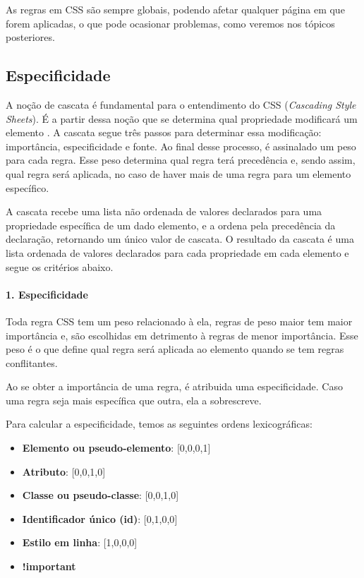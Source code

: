 As regras em CSS são sempre globais,
podendo afetar qualquer página em que forem aplicadas, o que pode ocasionar
problemas, como veremos nos tópicos posteriores.

\hypertarget{especificidade}{%
\subsection{Especificidade}\label{especificidade}}

A noção de cascata é fundamental para o entendimento do CSS (\emph{Cascading
Style Sheets}). É a partir dessa noção que se determina qual propriedade
modificará um elemento \cite{friedman}. A cascata segue três passos para determinar essa
modificação: importância, especificidade e fonte. Ao final desse
processo, é assinalado um peso para cada regra. Esse peso determina qual
regra terá precedência e, sendo assim, qual regra será aplicada, no caso
de haver mais de uma regra para um elemento específico. \nocite{cascading}

A cascata recebe uma lista não ordenada de valores declarados para uma
propriedade específica de um dado elemento, e a ordena pela precedência
da declaração, retornando um único valor de cascata. O resultado da
cascata é uma lista ordenada de valores declarados para cada propriedade
em cada elemento e segue os critérios abaixo.

\hypertarget{especificidade-1}{%
\paragraph{1. Especificidade}\label{especificidade-1}}

Toda regra CSS tem um peso relacionado à ela, regras de peso maior tem
maior importância e, são escolhidas em detrimento à regras de menor importância. Esse peso é o que define qual regra será aplicada ao
elemento quando se tem regras conflitantes.

Ao se obter a importância de uma regra, é atribuida uma especificidade.
Caso uma regra seja mais específica que outra, ela a sobrescreve.

Para calcular a especificidade, temos as seguintes ordens lexicográficas: 

\begin{itemize}
\tightlist
\item
  \textbf{Elemento ou pseudo-elemento}: {[}0,0,0,1{]}
  \item
  \textbf{Atributo}: {[}0,0,1,0{]}
  \item
  \textbf{Classe ou pseudo-classe}: {[}0,0,1,0{]}
  \item
  \textbf{Identificador único (id)}: {[}0,1,0,0{]}
  \item
  \textbf{Estilo em linha}: {[}1,0,0,0{]}
  \item
  \textbf{!important}
\end{itemize}


